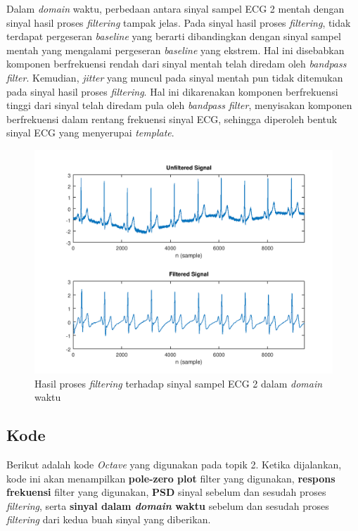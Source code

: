 \documentclass[11pt]{article}
\begin{document}
Dalam \textit{domain} waktu, perbedaan antara sinyal sampel ECG 2 mentah dengan sinyal hasil proses \textit{filtering} tampak jelas. Pada sinyal hasil proses \textit{filtering}, tidak terdapat pergeseran \textit{baseline} yang berarti dibandingkan dengan sinyal sampel mentah yang mengalami pergeseran \textit{baseline} yang ekstrem. Hal ini disebabkan komponen berfrekuensi rendah dari sinyal mentah telah diredam oleh \textit{bandpass filter}. Kemudian, \textit{jitter} yang muncul pada sinyal mentah pun tidak ditemukan pada sinyal hasil proses \textit{filtering}. Hal ini dikarenakan komponen berfrekuensi tinggi dari sinyal telah diredam pula oleh \textit{bandpass filter}, menyisakan komponen berfrekuensi dalam rentang frekuensi sinyal ECG, sehingga diperoleh bentuk sinyal ECG yang menyerupai \textit{template}. 

\begin{figure}[H]
\centerline{\includegraphics[scale=0.55]{figures/fig24-ecg2filteredtime.png}}
\caption{Hasil proses \textit{filtering} terhadap sinyal sampel ECG 2 dalam \textit{domain} waktu}
\label{ecg2filteredtime}
\end{figure}

\subsection{Kode}

Berikut adalah kode \textit{Octave} yang digunakan pada topik 2. Ketika dijalankan, kode ini akan menampilkan \textbf{pole-zero plot} filter yang digunakan, \textbf{respons frekuensi} filter yang digunakan, \textbf{PSD} sinyal sebelum dan sesudah proses \textit{filtering}, serta \textbf{sinyal dalam \textit{domain} waktu} sebelum dan sesudah proses \textit{filtering} dari kedua buah sinyal yang diberikan.
\end{document}
